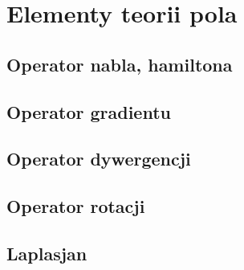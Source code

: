 \chapter{Elementy teorii pola}

\section{Operator nabla, hamiltona}

\section{Operator gradientu}

\section{Operator dywergencji}

\section{Operator rotacji}

\section{Laplasjan}